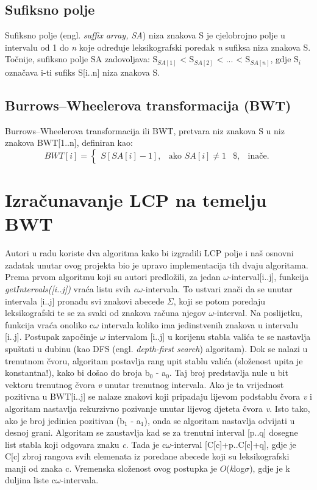 \documentclass[times, utf8, seminar]{fer}
\begin{document}
\subsection{Sufiksno polje}
Sufiksno polje (engl. \textit{suffix array, SA}) niza znakova S je cjelobrojno polje u intervalu od 1 do \textit{n} koje određuje leksikografski poredak \textit{n} sufiksa niza znakova S. Točnije, sufiksno polje SA zadovoljava: S$_{SA[1]}$ < S$_{SA[2]}$ < ... < S$_{SA[n]}$, gdje S$_i$ označava i-ti sufiks S[i..n] niza znakova S. 

\subsection{Burrows--Wheelerova transformacija (BWT)}

\label{BWT_def}
Burrows--Wheelerova transformacija ili BWT, pretvara niz znakova S u niz znakova BWT[1..n], definiran kao: 
\[
BWT[i]=\begin{cases}
	S[SA[i]-1], & \text{ako } SA[i]\neq 1 &
	\$, & \text{inače}.
\end{cases}
\]

\section{Izračunavanje LCP na temelju BWT}
\label{[algoritmi_def]}
Autori u radu \cite{beller2013} koriste dva algoritma kako bi izgradili LCP polje i naš osnovni zadatak unutar ovog projekta bio je upravo implementacija tih dvaju algoritama.
Prema prvom algoritmu koji su autori predložili, za jedan $\omega$-interval[i..j], funkcija \textit{getIntervals([i..j])} vraća listu svih \textit{c$\omega$}-intervala. To ustvari znači da se unutar intervala [i..j] pronađu svi znakovi abecede $\Sigma$, koji se potom poredaju leksikografski te se za svaki od znakova računa njegov $\omega$-interval. Na poslijetku, funkcija vraća onoliko c$\omega$ intervala koliko ima jedinstvenih znakova u intervalu [i..j].
Postupak započinje $\omega$ intervalom [i..j] u korijenu stabla valića te se nastavlja spuštati u dubinu (kao DFS (engl. \textit{depth-first search}) algoritam).
Dok se nalazi u trenutnom čvoru, algoritam postavlja rang upit stablu valića (složenost upita je konstantna!), kako bi došao do broja b$_{0}$ - a$_{0}$. Taj broj predstavlja nule u bit vektoru trenutnog čvora \textit{v} unutar trenutnog intervala. Ako je ta vrijednost pozitivna u BWT[i..j] se nalaze znakovi koji pripadaju lijevom podstablu čvora \textit{v} i algoritam nastavlja rekurzivno pozivanje unutar lijevog djeteta čvora \textit{v}. Isto tako, ako je broj jedinica pozitivan (b$_1$ - a$_1$), onda se algoritam nastavlja odvijati u desnoj grani. Algoritam se zaustavlja kad se za trenutni interval [p..q] dosegne list stabla koji odgovara znaku \textit{c}. Tada je c$\omega$-interval [C[c]+p..C[c]+q], gdje je C[c] zbroj rangova svih elemenata iz poredane abecede koji su leksikografski manji od znaka c. Vremenska složenost ovog postupka je $O$(\textit{k}log$\sigma$), gdje je k duljina liste c$\omega$-intervala.
\end{document}
